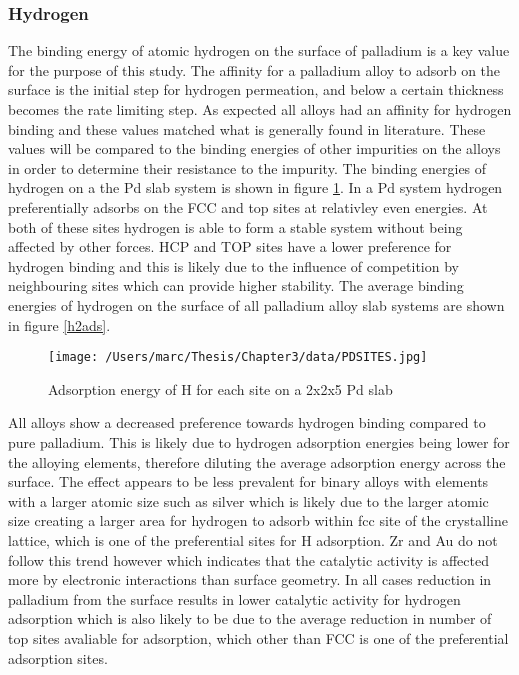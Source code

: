 \subsubsection{Hydrogen}
The binding energy of atomic hydrogen on the surface of palladium is a key value for the purpose of this study. The affinity for a palladium alloy to adsorb on the surface is the initial step for hydrogen permeation, and below a certain thickness becomes the rate limiting step. As expected all alloys had an affinity for hydrogen binding and these values matched what is generally found in literature. These values will be compared to the binding energies of other impurities on the alloys in order to determine their resistance to the impurity. The binding energies of hydrogen on a the Pd slab system is shown in figure \ref{Pdsite}. In a Pd system hydrogen preferentially adsorbs on the FCC and top sites at relativley even energies. At both of these sites hydrogen is able to form a stable system without being affected by other forces. HCP and TOP sites have a lower preference for hydrogen binding and this is likely due to the influence of competition by neighbouring sites which can provide higher stability. The average binding energies of hydrogen on the surface of all palladium alloy slab systems are shown in figure \ref{h2ads}.

\begin{figure}
  \centering
  \texttt{[image: /Users/marc/Thesis/Chapter3/data/PDSITES.jpg]}
  \caption{Adsorption energy of H for each site on a 2x2x5 Pd slab}
  \label{Pdsite}
\end{figure}

All alloys show a decreased preference towards hydrogen binding compared to pure palladium. This is likely due to hydrogen adsorption energies being lower for the alloying elements, therefore diluting the average adsorption energy across the surface. The effect appears to be less prevalent for binary alloys with elements with a larger atomic size such as silver which is likely due to the larger atomic size creating a larger area for hydrogen to adsorb within fcc site of the crystalline lattice, which is one of the preferential sites for H adsorption. Zr and Au do not follow this trend however which indicates that the catalytic activity is affected more by electronic interactions than surface geometry. In all cases reduction in palladium from the surface results in lower catalytic activity for hydrogen adsorption which is also likely to be due to the average reduction in number of top sites avaliable for adsorption, which other than FCC is one of the preferential adsorption sites. 

